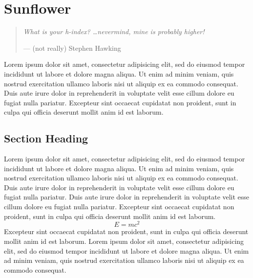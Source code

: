 

\chapter{Sunflower}

\begin{quote}
  \itshape
  What is your h-index? \dots nevermind, mine is probably higher!\par
  \hfill--- (not really) Stephen Hawking
\end{quote}

Lorem ipsum dolor sit amet, consectetur adipisicing elit, sed do eiusmod
tempor incididunt ut labore et dolore magna aliqua. Ut enim ad minim veniam,
quis nostrud exercitation ullamco laboris nisi ut aliquip ex ea commodo
consequat. Duis aute irure dolor in reprehenderit in voluptate velit esse
cillum dolore eu fugiat nulla pariatur. Excepteur sint occaecat cupidatat non
proident, sunt in culpa qui officia deserunt mollit anim id est laborum.

\section*{Section Heading}

Lorem ipsum dolor sit amet, consectetur adipisicing elit, sed do eiusmod
tempor incididunt ut labore et dolore magna aliqua. Ut enim ad minim veniam,
quis nostrud exercitation ullamco laboris nisi ut aliquip ex ea commodo
consequat. Duis aute irure dolor in reprehenderit in voluptate velit esse
cillum dolore eu fugiat nulla pariatur. Duis aute irure dolor in reprehenderit
in voluptate velit esse cillum dolore eu fugiat nulla pariatur. Excepteur
sint occaecat cupidatat non proident, sunt in culpa qui officia deserunt mollit
anim id est laborum.
\begin{equation*}
  E = mc^{2}
\end{equation*}
Excepteur sint occaecat cupidatat non
proident, sunt in culpa qui officia deserunt mollit anim id est laborum.
Lorem ipsum dolor sit amet, consectetur adipisicing elit, sed do eiusmod
tempor incididunt ut labore et dolore magna aliqua. Ut enim ad minim veniam,
quis nostrud exercitation ullamco laboris nisi ut aliquip ex ea commodo
consequat.

